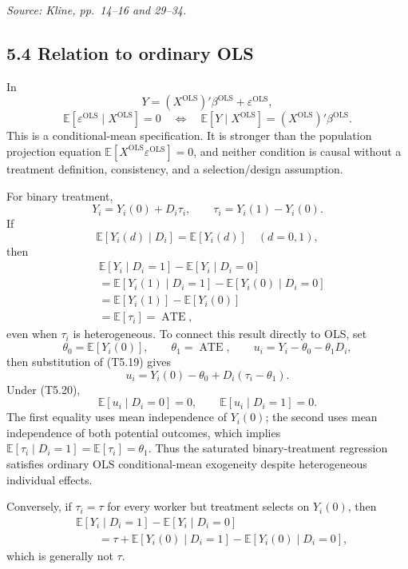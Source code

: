 \documentclass[11pt]{article}
\begin{document}
\textit{Source: Kline, pp.\ 14--16 and 29--34.}

\subsection{5.4 Relation to ordinary OLS}

In
\[
Y=(X^{\mathrm{OLS}})'\beta^{\mathrm{OLS}}
+\varepsilon^{\mathrm{OLS}},
\tag{T5.17}
\]
\[
\mathbb E[\varepsilon^{\mathrm{OLS}}\mid X^{\mathrm{OLS}}]=0
\quad\Longleftrightarrow\quad
\mathbb E[Y\mid X^{\mathrm{OLS}}]
=(X^{\mathrm{OLS}})'\beta^{\mathrm{OLS}}.
\tag{T5.18}
\]
This is a conditional-mean specification.  It is stronger than the
population projection equation
\(\mathbb E[X^{\mathrm{OLS}}\varepsilon^{\mathrm{OLS}}]=0\), and neither condition is
causal without a treatment definition, consistency, and a selection/design
assumption.

For binary treatment,
\[
Y_i=Y_i(0)+D_i\tau_i,
\qquad
\tau_i=Y_i(1)-Y_i(0).
\tag{T5.19}
\]
If
\[
\mathbb E[Y_i(d)\mid D_i]
=
\mathbb E[Y_i(d)]
\quad(d=0,1),
\tag{T5.20}
\]
then
\[
\begin{aligned}
&\mathbb E[Y_i\mid D_i=1]-\mathbb E[Y_i\mid D_i=0]\\
&=
\mathbb E[Y_i(1)\mid D_i=1]
-\mathbb E[Y_i(0)\mid D_i=0]\\
&=
\mathbb E[Y_i(1)]-\mathbb E[Y_i(0)]\\
&=
\mathbb E[\tau_i]
=\operatorname{ATE},
\end{aligned}
\tag{T5.21}
\]
even when \(\tau_i\) is heterogeneous.  To connect this result directly to
OLS, set
\[
\theta_0=\mathbb E[Y_i(0)],
\qquad
\theta_1=\operatorname{ATE},
\qquad
u_i=Y_i-\theta_0-\theta_1D_i,
\tag{T5.21a}
\]
then substitution of (T5.19) gives
\[
u_i=
Y_i(0)-\theta_0
+D_i(\tau_i-\theta_1).
\tag{T5.21b}
\]
Under (T5.20),
\[
\mathbb E[u_i\mid D_i=0]=0,
\qquad
\mathbb E[u_i\mid D_i=1]=0.
\tag{T5.21c}
\]
The first equality uses mean independence of \(Y_i(0)\); the second uses
mean independence of both potential outcomes, which implies
\(\mathbb E[\tau_i\mid D_i=1]=\mathbb E[\tau_i]=\theta_1\).
Thus the saturated binary-treatment regression satisfies ordinary OLS
conditional-mean exogeneity despite heterogeneous individual effects.

Conversely, if
\(\tau_i=\tau\) for every worker but treatment selects on \(Y_i(0)\), then
\[
\begin{aligned}
&\mathbb E[Y_i\mid D_i=1]
-\mathbb E[Y_i\mid D_i=0]\\
&\qquad =
\tau
+\mathbb E[Y_i(0)\mid D_i=1]
-\mathbb E[Y_i(0)\mid D_i=0],
\end{aligned}
\tag{T5.22}
\]
which is generally not \(\tau\).
\end{document}
